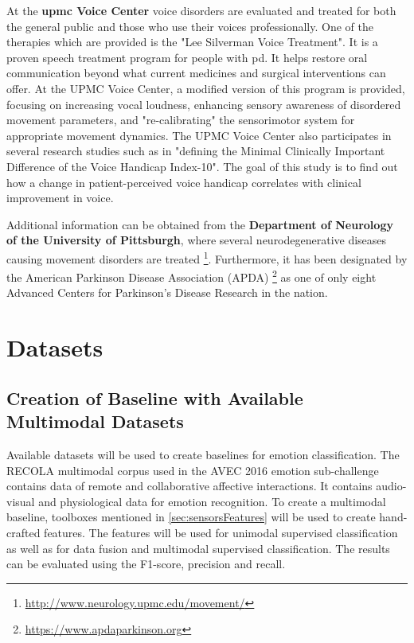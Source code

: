 At the \textbf{\gls{upmc} Voice Center} voice disorders are evaluated and treated for both the general public and those who use their voices professionally. One of the therapies which are provided is the "Lee Silverman Voice Treatment". It is a proven speech treatment program for people with \gls{pd}. It helps restore oral communication beyond what current medicines and surgical interventions can offer. At the UPMC Voice Center, a modified version of this program is provided, focusing on increasing vocal loudness, enhancing sensory awareness of disordered movement parameters, and "re-calibrating" the sensorimotor system for appropriate movement dynamics.
The UPMC Voice Center also participates in several research studies such as in "defining the Minimal Clinically Important Difference of the Voice Handicap Index-10". The goal of this study is to find out how a change in patient-perceived voice handicap correlates with clinical improvement in voice. 

Additional information can be obtained from the \textbf{Department of Neurology of the University of Pittsburgh}, where several neurodegenerative diseases causing movement disorders are treated \footnote{
\url{http://www.neurology.upmc.edu/movement/}}. Furthermore, it has been designated by the American Parkinson Disease Association (APDA) \footnote{ \url{https://www.apdaparkinson.org}} as one of only eight Advanced Centers for Parkinson’s Disease Research in the nation.

\section{Datasets}

\subsection{Creation of Baseline with Available Multimodal Datasets}
\label{subsec:availableData}
Available datasets will be used to create baselines for emotion classification. The RECOLA multimodal corpus used in the AVEC 2016 emotion sub-challenge contains data of remote and collaborative affective interactions. It contains audio-visual and physiological data for emotion recognition. To create a multimodal baseline, toolboxes mentioned in \ref{sec:sensorsFeatures} will be used to create hand-crafted features. The features will be used for unimodal supervised classification as well as for data fusion and multimodal supervised classification.  The results can be evaluated using the F1-score, precision and recall.

